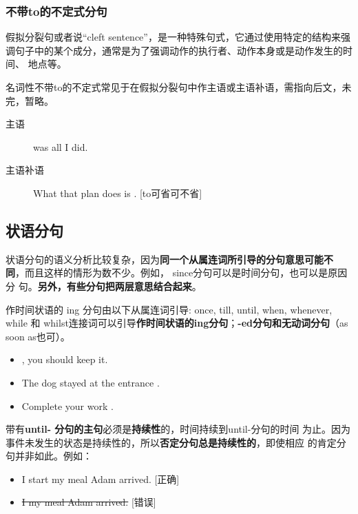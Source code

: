 \subsubsection{不带to的不定式分句}

假拟分裂句或者说“cleft sentence”，是一种特殊句式，它通过使用特定的结构来强
调句子中的某个成分，通常是为了强调动作的执行者、动作本身或是动作发生的时间、
地点等。

名词性不带to的不定式常见于在假拟分裂句中作主语或主语补语，需指向后文，未完，暂略。
\begin{description}
\item[主语]  was all I did.
\item[主语补语] What that plan does is .
  [to可省可不省]
\end{description}



\subsection{状语分句}

状语分句的语义分析比较复杂，因为\textbf{同一个从属连词所引导的分句意思可能不
  同}，而且这样的情形为数不少。例如， since分句可以是时间分句，也可以是原因分
句。\textbf{另外，有些分句把两层意思结合起来}。

作时间状语的 ing 分句由以下从属连词引导: once, till, until, when, whenever,
while 和 whilst连接词可以引导\textbf{作时间状语的ing分句}；\textbf{-ed分句和无动词分句}（as soon
as也可）。
\begin{itemize}
\item {}, you should keep it.
\item The dog stayed at the entrance .
\item Complete your work .
\end{itemize}

带有\textbf{until- 分句的主句}必须是\textbf{持续性}的，时间持续到until-分句的时间
为止。因为事件未发生的状态是持续性的，所以\textbf{否定分句总是持续性的}，即使相应
的肯定分句并非如此。例如：
\begin{itemize}
\item I  start my meal  Adam arrived. [正确]
\item \sout{I  my meal  Adam arrived.} [错误]
\end{itemize}


